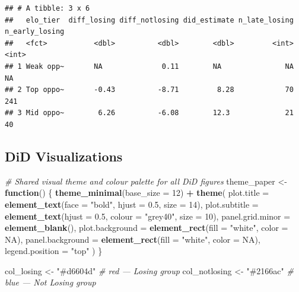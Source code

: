 \documentclass[
]{article}
\newenvironment{Shaded}{\begin{snugshade}}{\end{snugshade}}
\newcommand{\AttributeTok}[1]{\textcolor[rgb]{0.13,0.29,0.53}{#1}}
\newcommand{\CommentTok}[1]{\textcolor[rgb]{0.56,0.35,0.01}{\textit{#1}}}
\newcommand{\ConstantTok}[1]{\textcolor[rgb]{0.56,0.35,0.01}{#1}}
\newcommand{\ControlFlowTok}[1]{\textcolor[rgb]{0.13,0.29,0.53}{\textbf{#1}}}
\newcommand{\DecValTok}[1]{\textcolor[rgb]{0.00,0.00,0.81}{#1}}
\newcommand{\FloatTok}[1]{\textcolor[rgb]{0.00,0.00,0.81}{#1}}
\newcommand{\FunctionTok}[1]{\textcolor[rgb]{0.13,0.29,0.53}{\textbf{#1}}}
\newcommand{\NormalTok}[1]{#1}
\newcommand{\OtherTok}[1]{\textcolor[rgb]{0.56,0.35,0.01}{#1}}
\newcommand{\SpecialCharTok}[1]{\textcolor[rgb]{0.81,0.36,0.00}{\textbf{#1}}}
\newcommand{\StringTok}[1]{\textcolor[rgb]{0.31,0.60,0.02}{#1}}
\begin{document}
\begin{verbatim}
## # A tibble: 3 x 6
##   elo_tier  diff_losing diff_notlosing did_estimate n_late_losing n_early_losing
##   <fct>           <dbl>          <dbl>        <dbl>         <int>          <int>
## 1 Weak opp~       NA              0.11        NA               NA             NA
## 2 Top oppo~       -0.43          -8.71         8.28            70            241
## 3 Mid oppo~        6.26          -6.08        12.3             21             40
\end{verbatim}

\subsection{DiD Visualizations}\label{did-visualizations}

\begin{Shaded}
\begin{Highlighting}[]
\CommentTok{\# Shared visual theme and colour palette for all DiD figures}
\NormalTok{theme\_paper }\OtherTok{\textless{}{-}} \ControlFlowTok{function}\NormalTok{() \{}
  \FunctionTok{theme\_minimal}\NormalTok{(}\AttributeTok{base\_size =} \DecValTok{12}\NormalTok{) }\SpecialCharTok{+}
    \FunctionTok{theme}\NormalTok{(}
      \AttributeTok{plot.title       =} \FunctionTok{element\_text}\NormalTok{(}\AttributeTok{face =} \StringTok{"bold"}\NormalTok{, }\AttributeTok{hjust =} \FloatTok{0.5}\NormalTok{, }\AttributeTok{size =} \DecValTok{14}\NormalTok{),}
      \AttributeTok{plot.subtitle    =} \FunctionTok{element\_text}\NormalTok{(}\AttributeTok{hjust =} \FloatTok{0.5}\NormalTok{, }\AttributeTok{colour =} \StringTok{"grey40"}\NormalTok{, }\AttributeTok{size =} \DecValTok{10}\NormalTok{),}
      \AttributeTok{panel.grid.minor =} \FunctionTok{element\_blank}\NormalTok{(),}
      \AttributeTok{plot.background  =} \FunctionTok{element\_rect}\NormalTok{(}\AttributeTok{fill =} \StringTok{"white"}\NormalTok{, }\AttributeTok{color =} \ConstantTok{NA}\NormalTok{),}
      \AttributeTok{panel.background =} \FunctionTok{element\_rect}\NormalTok{(}\AttributeTok{fill =} \StringTok{"white"}\NormalTok{, }\AttributeTok{color =} \ConstantTok{NA}\NormalTok{),}
      \AttributeTok{legend.position  =} \StringTok{"top"}
\NormalTok{    )}
\NormalTok{\}}

\NormalTok{col\_losing    }\OtherTok{\textless{}{-}} \StringTok{"\#d6604d"}   \CommentTok{\# red   — Losing group}
\NormalTok{col\_notlosing }\OtherTok{\textless{}{-}} \StringTok{"\#2166ac"}   \CommentTok{\# blue  — Not Losing group}
\end{Highlighting}
\end{Shaded}
\end{document}
